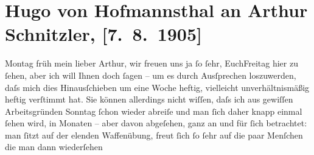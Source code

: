 

         
         \renewcommand{\erwaehntePersonen}{Personen: Hermann Bahr, Anna Bahr-Mildenburg, Richard Beer-Hofmann, Hugo von Hofmannsthal, Olga Schnitzler}
         \renewcommand{\erwaehnteOrte}{Orte: Bayern, Wien}
         \renewcommand{\erwaehnteWerke}{}
               \section[Hugo von Hofmannsthal an Arthur Schnitzler, {[}7. 8. 1905{]}]{ Hugo von Hofmannsthal an Arthur Schnitzler, {[}7. 8. 1905{]}}\nopagebreak{}\rehead{ }\begin{ledgroupsized}[t]{13cm}\normalsize\beginnumbering \toendnotes[C]{\smallbreak\pagebreak[2]} 
\toendnotes[C]{\smallbreak}\pstart
           \raggedleft{}{\pb}Montag früh\pend
           \pstart{}mein lieber Arthur,\pend\pstart
           wir freuen uns ja ſo ſehr, EuchFreitag hier zu ſehen, aber ich will Ihnen doch ſagen – um es durch
               Ausſprechen loszuwerden, daſs mich dies Hinausſchieben um eine Woche heftig,
               vielleicht unverhältnismäßig heftig verſtimmt hat. \label{OL450-1v}\label{OL450-1h}Sie können allerdings nicht wiſſen, {\pb}daſs ich aus gewiſſen
               Arbeitsgründen Sonntag{ }ſchon wieder abreiſe und man ſich daher knapp
               einmal ſehen wird, in Monaten – aber davon abgeſehen, ganz an und für ſich
               betrachtet: man ſitzt auf der elenden Waffenübung, freut ſich ſo ſehr auf die paar
               Menſchen {\pb}die man dann wiederſehen

\end{ledgroupsized}
